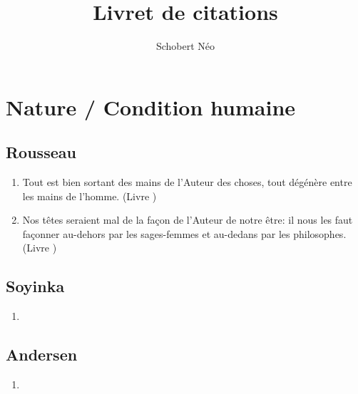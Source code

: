 \documentclass[a4paper, 11pt, hidelinks]{article}
\newcommand{\rb}[1]{\Romanbar{#1}}
\begin{document}
\newcommand{\grad}[1]{\vv{grad}#1}


\title{Livret de citations}
\author{Schobert Néo}

\maketitle

\tableofcontents


\newpage














\section{Nature / Condition humaine}



\subsection{Rousseau}


\begin{enumerate}
    \item Tout est bien sortant des mains de l'Auteur des choses, tout dégénère entre les mains de l'homme. (Livre \rb{1})
    \item Nos têtes seraient mal de la façon de l'Auteur de notre être: il nous les faut façonner au-dehors par les sages-femmes et au-dedans par les philosophes. (Livre \rb{1})
\end{enumerate}



\subsection{Soyinka}


\begin{enumerate}
    \item 
\end{enumerate}




\subsection{Andersen}


\begin{enumerate}
    \item 
\end{enumerate}
\end{document}
